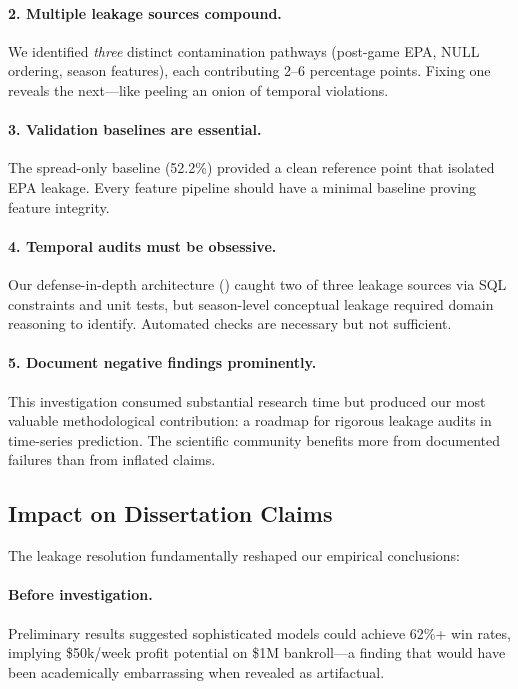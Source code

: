 \paragraph{2. Multiple leakage sources compound.}
We identified \emph{three} distinct contamination pathways (post-game EPA, NULL ordering, season features), each contributing 2--6 percentage points. Fixing one reveals the next---like peeling an onion of temporal violations.

\paragraph{3. Validation baselines are essential.}
The spread-only baseline (52.2\%) provided a clean reference point that isolated EPA leakage. Every feature pipeline should have a minimal baseline proving feature integrity.

\paragraph{4. Temporal audits must be obsessive.}
Our defense-in-depth architecture () caught two of three leakage sources via SQL constraints and unit tests, but season-level conceptual leakage required domain reasoning to identify. Automated checks are necessary but not sufficient.

\paragraph{5. Document negative findings prominently.}
This investigation consumed substantial research time but produced our most valuable methodological contribution: a roadmap for rigorous leakage audits in time-series prediction. The scientific community benefits more from documented failures than from inflated claims.

\subsection{Impact on Dissertation Claims}

The leakage resolution fundamentally reshaped our empirical conclusions:

\paragraph{Before investigation.}
Preliminary results suggested sophisticated models could achieve 62\%+ win rates, implying \$50k/week profit potential on \$1M bankroll---a finding that would have been academically embarrassing when revealed as artifactual.

